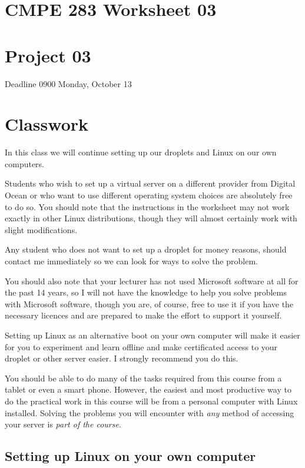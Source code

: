 \documentclass[12pt, a4paper]{article}
\begin{document}

\section*{CMPE 283 Worksheet 03}
\section*{Project 03} 
Deadline 0900 Monday, October 13

\section*{Classwork}
In this class we will continue setting up our droplets and Linux on our own 
computers.

Students who wish to set up a virtual server on a different provider from 
Digital Ocean or who want to use different operating system choices are 
absolutely free to do so. You should note that the instructions in the worksheet may not work exactly in other Linux distributions, though they will almost certainly work with slight modifications.

Any student who does not want to set up a droplet for money reasons, should contact me immediately so we can look for ways to solve the problem. 

You should also note that your lecturer has not used Microsoft software at all for the past 14 years, so I will not have the knowledge to help you solve problems with Microsoft software, though you are, of course, free to use it if you have the necessary licences and are prepared to make the effort to support it yourself. 

Setting up Linux as an alternative boot on your own computer will make it easier for you to experiment and learn offline and make certificated access to your droplet or other server easier. I strongly recommend you do this.

You should be able to do many of the tasks required from this course from a tablet or even a smart phone. However, the easiest and most productive way to do the practical work in this course will be from a personal computer with Linux installed. Solving the problems you will encounter with \emph{any} method of accessing your server is \emph{part of the course}.

\subsection*{Setting up Linux on your own computer}
\end{document}
